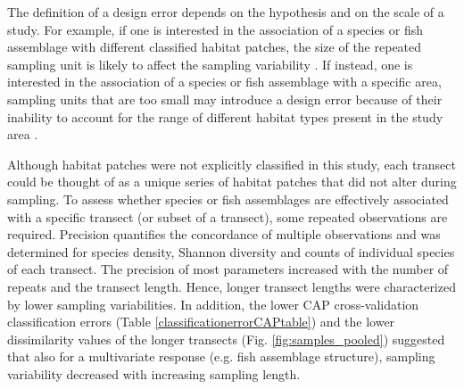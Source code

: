 \documentclass[10pt,letterpaper]{article}
\begin{document}
The definition of a design error depends on the hypothesis and on the scale of a study. For example, if one is interested in the association of a species or fish assemblage with different classified habitat patches, the size of the repeated sampling unit is likely to affect the sampling variability \cite{McCormick1987EstimatingStrip-transects}. If instead, one is interested in the association of a species or fish assemblage with a specific area, sampling units that are too small may introduce a design error because of their inability to account for the range of different habitat types present in the study area \cite{Sale1983CorrectionFishes}. 

Although habitat patches were not explicitly classified in this study, each transect could be thought of as a unique series of habitat patches that did not alter during sampling. To assess whether species or fish assemblages are effectively associated with a specific transect (or subset of a transect), some repeated observations are required. Precision quantifies the concordance of multiple observations and was determined for species density, Shannon diversity and counts of individual species of each transect. The precision of most parameters increased with the number of repeats and the transect length. Hence, longer transect lengths were characterized by lower sampling variabilities. In addition, the lower CAP cross-validation classification errors (Table \ref{classificationerrorCAPtable}) and the lower dissimilarity values of the longer transects (Fig. \ref{fig:samples_pooled}) suggested that also for a multivariate response (e.g. fish assemblage structure), sampling variability decreased with increasing sampling length. 
\end{document}
